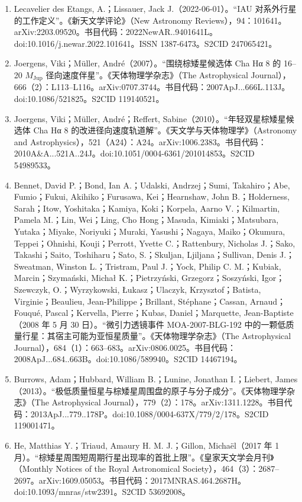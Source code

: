 \begin{enumerate}
\item Lecavelier des Etangs, A.；Lissauer, Jack J.（2022-06-01）。“IAU 对系外行星的工作定义”。《新天文学评论》（New Astronomy Reviews），94：101641。arXiv:2203.09520。书目代码：2022NewAR..9401641L。doi:10.1016/j.newar.2022.101641。ISSN 1387-6473。S2CID 247065421。
\item Joergens, Viki；Müller, André（2007）。“围绕棕矮星候选体 Cha Hα 8 的 16–20 $M_{\mathrm{Jup}}$ 径向速度伴星”。《天体物理学杂志》（The Astrophysical Journal），666（2）：L113–L116。arXiv:0707.3744。书目代码：2007ApJ...666L.113J。doi:10.1086/521825。S2CID 119140521。
\item Joergens, Viki；Müller, André；Reffert, Sabine（2010）。“年轻双星棕矮星候选体 Cha Hα 8 的改进径向速度轨道解”。《天文学与天体物理学》（Astronomy and Astrophysics），521（A24）：A24。arXiv:1006.2383。书目代码：2010A&A...521A..24J。doi:10.1051/0004-6361/201014853。S2CID 54989533。
\item Bennet, David P.；Bond, Ian A.；Udalski, Andrzej；Sumi, Takahiro；Abe, Fumio；Fukui, Akihiko；Furusawa, Kei；Hearnshaw, John B.；Holderness, Sarah；Itow, Yoshitaka；Kamiya, Koki；Korpela, Aarno V.；Kilmartin, Pamela M.；Lin, Wei；Ling, Cho Hong；Masuda, Kimiaki；Matsubara, Yutaka；Miyake, Noriyuki；Muraki, Yasushi；Nagaya, Maiko；Okumura, Teppei；Ohnishi, Kouji；Perrott, Yvette C.；Rattenbury, Nicholas J.；Sako, Takashi；Saito, Toshiharu；Sato, S.；Skuljan, Ljiljana；Sullivan, Denis J.；Sweatman, Winston L.；Tristram, Paul J.；Yock, Philip C. M.；Kubiak, Marcin；Szymański, Michał K.；Pietrzyński, Grzegorz；Soszyński, Igor；Szewczyk, O.；Wyrzykowski, Łukasz；Ulaczyk, Krzysztof；Batista, Virginie；Beaulieu, Jean-Philippe；Brillant, Stéphane；Cassan, Arnaud；Fouqué, Pascal；Kervella, Pierre；Kubas, Daniel；Marquette, Jean-Baptiste（2008 年 5 月 30 日）。“微引力透镜事件 MOA-2007-BLG-192 中的一颗低质量行星：其宿主可能为亚恒星质量”。《天体物理学杂志》（The Astrophysical Journal），684（1）：663–683。arXiv:0806.0025。书目代码：2008ApJ...684..663B。doi:10.1086/589940。S2CID 14467194。
\item Burrows, Adam；Hubbard, William B.；Lunine, Jonathan I.；Liebert, James（2013）。“极低质量恒星与棕矮星周围盘的原子与分子成分”。《天体物理学杂志》（The Astrophysical Journal），779（2）：178。arXiv:1311.1228。书目代码：2013ApJ...779..178P。doi:10.1088/0004-637X/779/2/178。S2CID 119001471。
\item He, Matthias Y.；Triaud, Amaury H. M. J.；Gillon, Michaël（2017 年 1 月）。“棕矮星周围短周期行星出现率的首批上限”。《皇家天文学会月刊》（Monthly Notices of the Royal Astronomical Society），464（3）：2687–2697。arXiv:1609.05053。书目代码：2017MNRAS.464.2687H。doi:10.1093/mnras/stw2391。S2CID 53692008。

\end{enumerate}
